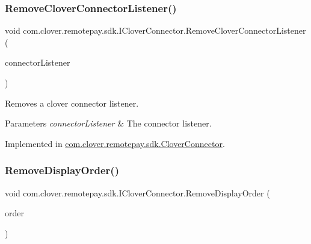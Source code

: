 \subsubsection{\texorpdfstring{Remove\+Clover\+Connector\+Listener()}{RemoveCloverConnectorListener()}}
{\footnotesize\ttfamily void com.\+clover.\+remotepay.\+sdk.\+I\+Clover\+Connector.\+Remove\+Clover\+Connector\+Listener (\begin{DoxyParamCaption}\item[{\hyperlink{interfacecom_1_1clover_1_1remotepay_1_1sdk_1_1_i_clover_connector_listener}{I\+Clover\+Connector\+Listener}}]{connector\+Listener }\end{DoxyParamCaption})}



Removes a clover connector listener. 


\begin{DoxyParams}{Parameters}
{\em connector\+Listener} & The connector listener.\\
\hline
\end{DoxyParams}


Implemented in \hyperlink{classcom_1_1clover_1_1remotepay_1_1sdk_1_1_clover_connector_a05aa30b8a934164519333645e267c2e5}{com.\+clover.\+remotepay.\+sdk.\+Clover\+Connector}.

\mbox{\label{interfacecom_1_1clover_1_1remotepay_1_1sdk_1_1_i_clover_connector_a55ebe329c852bedccaeb882ca71c4774}} 
\subsubsection{\texorpdfstring{Remove\+Display\+Order()}{RemoveDisplayOrder()}}
{\footnotesize\ttfamily void com.\+clover.\+remotepay.\+sdk.\+I\+Clover\+Connector.\+Remove\+Display\+Order (\begin{DoxyParamCaption}\item[{\hyperlink{classcom_1_1clover_1_1remote_1_1order_1_1_display_order}{Display\+Order}}]{order }\end{DoxyParamCaption})}



